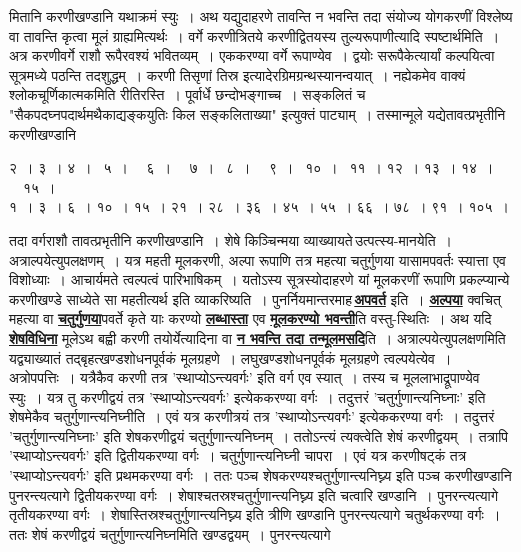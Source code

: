 \documentclass[11pt, openany]{book}
\begin{document}
\newpage

\begin{sloppypar}
\noindent मितानि करणीखण्डानि यथाक्रमं स्युः~। अथ यद्युदाहरणे तावन्ति न भवन्ति तदा संयोज्य योगकरणीं विश्लेष्य वा तावन्ति कृत्वा मूलं ग्राह्यमित्यर्थः~। वर्गे करणीत्रितये करणीद्वितयस्य तुल्यरूपाणीत्यादि स्पष्टार्थमिति~। अत्र करणीवर्गे राशौ रूपैरवश्यं भवितव्यम्~। एककरण्या वर्गे रूपाण्येव~। द्वयोः सरूपैकेत्यार्यां कल्पयित्वा सूत्रमध्ये पठन्ति तदशुद्धम्~। करणी तिसृणां तिस्र इत्यादेरग्रिमग्रन्थस्यानन्वयात्~। नह्येकमेव वाक्यं श्लोकचूर्णिकात्मकमिति रीतिरस्ति~। पूर्वार्धे छन्दोभङ्गाच्च~। सङ्कलितं च {\color{violet}"सैकपदघ्नपदार्थमथैकाद्यङ्कयुतिः किल सङ्कलिताख्या"} इत्युक्तं {\color{violet}पाट्याम्}~। तस्मान्मूले यद्येतावत्प्रभृतीनि करणीखण्डानि 

\begin{center}
२~। ३~। ४~। ~५~। ~~६~। ~~७~। ~८~। ~~९~। ~१०~। ~११~। १२~। १३~। १४~। ~~१५~।\\
१~। ३~। ६~। १०~। १५~। २१~। २८~। ३६~। ४५~। ५५~। ६६~। ७८~। ९१~। १०५~।
\end{center}

\noindent तदा वर्गराशौ तावत्प्रभृतीनि करणीखण्डानि~। शेषे किञ्चिन्मया व्याख्यायते\textendash \,उत्पत्स्य-मानयेति~। अत्राल्पयेत्युपलक्षणम्~। यत्र महती मूलकरणी, अल्पा रूपाणि तत्र महत्या चतुर्गुणया यासामपवर्तः स्यात्ता एव विशोध्याः~। आचार्यमते त्वल्पत्वं पारिभाषिकम्~। यतोऽस्य सूत्रस्योदाहरणे यां मूलकरणीं रूपाणि प्रकल्प्यान्ये करणीखण्डे साध्येते सा महतीत्यर्थ इति व्याकरिष्यति~। पुनर्नियमान्तरमाह\textendash \,\hyperref[4.44]{\textbf{अपवर्त}} इति~। \hyperref[4.44]{\textbf{अल्पया}} क्वचित् महत्या वा \hyperref[4.44]{\textbf{चतुर्गुणया}}पवर्ते कृते याः करण्यो \hyperref[4.44]{\textbf{लब्धास्ता}} एव \hyperref[4.44]{\textbf{मूलकरण्यो भवन्ती}}ति वस्तु-स्थितिः~। अथ यदि \hyperref[4.44]{\textbf{शेषविधिना}} मूलेऽथ बह्वी करणी तयोर्येत्यादिना वा \hyperref[4.44]{\textbf{न भवन्ति तदा तन्मूलमसदि}}ति~। अत्राल्पयेत्युपलक्षणमिति यद्व्याख्यातं तद्बृहत्खण्डशोधनपूर्वकं मूलग्रहणे~। लघुखण्डशोधनपूर्वकं मूलग्रहणे त्वल्पयेत्येव~। अत्रोपपत्तिः~। यत्रैकैव करणी तत्र {\color{violet}'स्थाप्योऽन्त्यवर्गः'} इति वर्ग एव स्यात्~। तस्य च मूललाभाद्रूपाण्येव स्युः~। यत्र तु करणीद्वयं तत्र {\color{violet}'स्थाप्योऽन्त्यवर्गः'} इत्येककरण्या वर्गः~। तदुत्तरं {\color{violet}'चतुर्गुणान्त्यनिघ्नाः'} इति शेषमेकैव चतुर्गुणान्त्यनिघ्नीति~। एवं यत्र करणीत्रयं तत्र {\color{violet}'स्थाप्योऽन्त्यवर्गः'} इत्येककरण्या वर्गः~। तदुत्तरं {\color{violet}'चतुर्गुणान्त्यनिघ्नाः'} इति शेषकरणीद्वयं चतुर्गुणान्त्यनिघ्नम्~। ततोऽन्त्यं त्यक्त्वेति शेषं करणीद्वयम्~। तत्रापि {\color{violet}'स्थाप्योऽन्त्यवर्गः'} इति द्वितीयकरण्या वर्गः~। चतुर्गुणान्त्यनिघ्नी चापरा~। एवं यत्र करणीषट्कं तत्र {\color{violet}'स्थाप्योऽन्त्यवर्गः'} इति प्रथमकरण्या वर्गः~। ततः पञ्च शेषकरण्यश्चतुर्गुणान्त्यनिघ्न्य इति पञ्च करणीखण्डानि पुनरन्त्यत्यागे द्वितीयकरण्या वर्गः~। शेषाश्चतस्रश्चतुर्गुणान्त्यनिघ्न्य इति चत्वारि खण्डानि~। पुनरन्त्यत्यागे तृतीयकरण्या वर्गः~। शेषास्तिस्रश्चतुर्गुणान्त्यनिघ्न्य इति त्रीणि खण्डानि पुनरन्त्यत्यागे चतुर्थकरण्या वर्गः~। ततः शेषं करणीद्वयं चतुर्गुणान्त्यनिघ्नमिति खण्डद्वयम्~। पुनरन्त्यत्यागे
\end{sloppypar}
\end{document}

